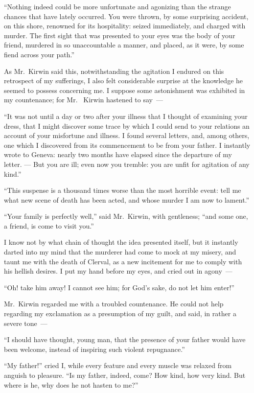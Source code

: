 ``Nothing indeed could be more
unfortunate and agonizing than the
strange chances that have lately occurred.
You were thrown, by some surprising
accident, on this shore, renowned
for its hospitality: seized immediately,
and charged with murder.
The first sight that was presented to
your eyes was the body of your friend,
murdered in so unaccountable a manner,
and placed, as it were, by some
fiend across your path.''

As Mr.~Kirwin said this, notwithstanding
the agitation I endured on
this retrospect of my sufferings, I also
felt considerable surprise at the knowledge
he seemed to possess concerning
me. I suppose some astonishment was
exhibited in my countenance; for Mr.~%
Kirwin hastened to say~---

``It was not until a day or two after
your illness that I thought of examining
your dress, that I might discover some
trace by which I could send to your relations
an account of your misfortune
and illness. I found several letters, and,
among others, one which I discovered
from its commencement to be from your
father. I instantly wrote to Geneva:
nearly two months have elapsed since
the departure of my letter. --- But you
are ill; even now you tremble: you
are unfit for agitation of any kind.''

``This suspense is a thousand times
worse than the most horrible event:
tell me what new scene of death has
been acted, and whose murder I am
now to lament.''

``Your family is perfectly well,''
said Mr.~Kirwin, with gentleness; ``and
some one, a friend, is come to visit
you.''

I know not by what chain of thought
the idea presented itself, but it instantly
darted into my mind that the murderer
had come to mock at my misery, and
taunt me with the death of Clerval, as
a new incitement for me to comply with
his hellish desires. I put my hand before
my eyes, and cried out in agony~---

``Oh! take him away! I cannot see
him; for God's sake, do not let him
enter!''

Mr.~Kirwin regarded me with a
troubled countenance. He could not
help regarding my exclamation as a
presumption of my guilt, and said, in
rather a severe tone~---

``I should have thought, young man,
that the presence of your father would
have been welcome, instead of inspiring
such violent repugnance.''

``My father!'' cried I, while every
feature and every muscle was relaxed
from anguish to pleasure. ``Is my
father, indeed, come? How kind,
how very kind. But where is he, why
does he not hasten to me?''


